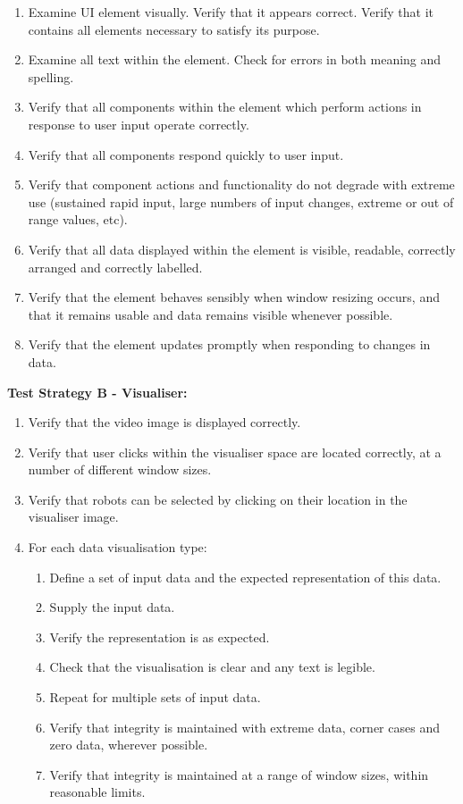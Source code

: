 \begin{enumerate}
 \item Examine UI element visually. Verify that it appears correct. Verify that it contains all elements necessary to satisfy its purpose.
 \item Examine all text within the element. Check for errors in both meaning and spelling.
 \item Verify that all components within the element which perform actions in response to user input operate correctly.
 \item Verify that all components respond quickly to user input.
 \item Verify that component actions and functionality do not degrade with extreme use (sustained rapid input, large numbers of input changes, extreme or out of range values, etc).
 \item Verify that all data displayed within the element is visible, readable, correctly arranged and correctly labelled.
 \item Verify that the element behaves sensibly when window resizing occurs, and that it remains usable and data remains visible whenever possible.
 \item Verify that the element updates promptly when responding to changes in data.
\end{enumerate}

\textbf{Test Strategy B - Visualiser:}

\begin{enumerate}
 \item Verify that the video image is displayed correctly.
 \item Verify that user clicks within the visualiser space are located correctly, at a number of different window sizes.
 \item Verify that robots can be selected by clicking on their location in the visualiser image.
 \item For each data visualisation type:
 \begin{enumerate}
  \item Define a set of input data and the expected representation of this data.
  \item Supply the input data.
  \item Verify the representation is as expected.
  \item Check that the visualisation is clear and any text is legible.
  \item Repeat for multiple sets of input data.
  \item Verify that integrity is maintained with extreme data, corner cases and zero data, wherever possible.
  \item Verify that integrity is maintained at a range of window sizes, within reasonable limits.
 \end{enumerate}
\end{enumerate}

